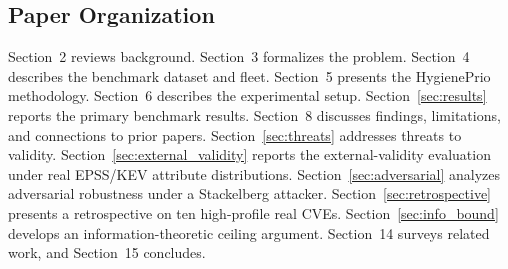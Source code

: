 \subsection{Paper Organization}

Section~2 reviews background. Section~3 formalizes the problem. Section~4 describes the benchmark dataset and fleet. Section~5 presents the HygienePrio methodology. Section~6 describes the experimental setup. Section~\ref{sec:results} reports the primary benchmark results. Section~8 discusses findings, limitations, and connections to prior papers. Section~\ref{sec:threats} addresses threats to validity. Section~\ref{sec:external_validity} reports the external-validity evaluation under real EPSS/KEV attribute distributions. Section~\ref{sec:adversarial} analyzes adversarial robustness under a Stackelberg attacker. Section~\ref{sec:retrospective} presents a retrospective on ten high-profile real CVEs. Section~\ref{sec:info_bound} develops an information-theoretic ceiling argument. Section~14 surveys related work, and Section~15 concludes.
